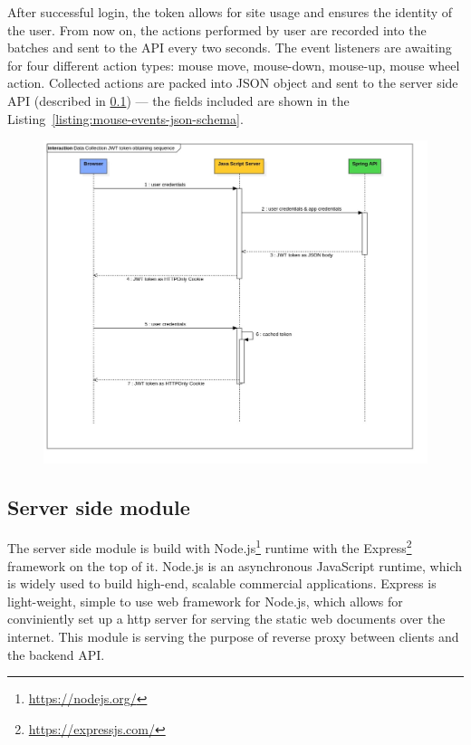 After successful login, the token allows for site usage and ensures the identity of the user.
From now on, the actions performed by user are recorded into the batches and sent to the API every two seconds.
The event listeners are awaiting for four different action types: mouse move, mouse-down, mouse-up, mouse wheel action.
Collected actions are packed into JSON object and sent to the server side API (described in \ref{subsec:server-side-module}) --- the fields included are shown in the Listing~\ref{listing:mouse-events-json-schema}.





\begin{figure}[!hbt]
    
    \centering
    \includegraphics[width=\linewidth]{resources/JWT token obtaining sequence.jpg}
    \captionsetup{width=\linewidth}
    \label{fig:jwt-sequence}
\end{figure}

\subsection{Server side module}\label{subsec:server-side-module}
The server side module is build with Node.js\footnote{\url{https://nodejs.org/}} runtime with the Express\footnote{\url{https://expressjs.com/}} framework on the top of it.
Node.js is an asynchronous JavaScript runtime, which is widely used to build high-end, scalable commercial applications.
Express is light-weight, simple to use web framework for Node.js, which allows for conviniently set up a http server for serving the static web documents over the internet.
This module is serving the purpose of reverse proxy between clients and the backend API.

